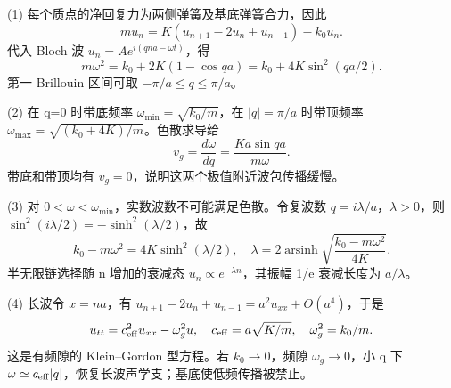 (1) 每个质点的净回复力为两侧弹簧及基底弹簧合力，因此
\[
m\ddot u_n=K(u_{n+1}-2u_n+u_{n-1})-k_0u_n.
\]
代入 Bloch 波 \(u_n=Ae^{i(qna-\omega t)}\)，得
\[
m\omega^2=k_0+2K(1-\cos qa)
=k_0+4K\sin^2(qa/2).
\]
第一 Brillouin 区间可取 \(-\pi/a\le q\le\pi/a\)。

(2) 在 q=0 时带底频率 \(\omega_{\min}=\sqrt{k_0/m}\)，在 \(|q|=\pi/a\) 时带顶频率 \(\omega_{\max}=\sqrt{(k_0+4K)/m}\)。色散求导给
\[
v_g=\frac{d\omega}{dq}=\frac{Ka\sin qa}{m\omega}.
\]
带底和带顶均有 \(v_g=0\)，说明这两个极值附近波包传播缓慢。

(3) 对 \(0<\omega<\omega_{\min}\)，实数波数不可能满足色散。令复波数 \(q=i\lambda/a\)，\(\lambda>0\)，则 \(\sin^2(i\lambda/2)=-\sinh^2(\lambda/2)\)，故
\[
k_0-m\omega^2=4K\sinh^2(\lambda/2),\quad
\lambda=2\operatorname{arsinh}\sqrt{\frac{k_0-m\omega^2}{4K}}.
\]
半无限链选择随 n 增加的衰减态 \(u_n\propto e^{-\lambda n}\)，其振幅 1/e 衰减长度为 \(a/\lambda\)。

(4) 长波令 \(x=na\)，有 \(u_{n+1}-2u_n+u_{n-1}=a^2u_{xx}+O(a^4)\)，于是
\[
u_{tt}=c_{\rm eff}^2u_{xx}-\omega_g^2u,
\quad c_{\rm eff}=a\sqrt{K/m},\quad\omega_g^2=k_0/m.
\]
这是有频隙的 Klein–Gordon 型方程。若 \(k_{0}\to 0\)，频隙 \(\omega_g\to0\)，小 q 下 \(\omega\simeq c_{\rm eff}|q|\)，恢复长波声学支；基底使低频传播被禁止。
